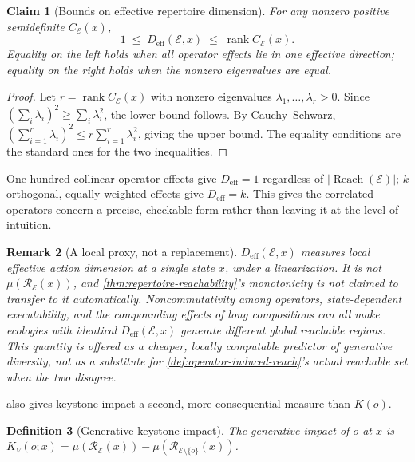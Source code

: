 \documentclass[12pt]{report}
\newtheorem{definition}{Definition}[section]
\newtheorem{claim}[definition]{Claim}
\newtheorem{remark}[definition]{Remark}
\newcommand{\Reach}{\ensuremath{\operatorname{Reach}}}
\begin{document}
\begin{claim}[Bounds on effective repertoire dimension]
\label{thm:effective-repertoire-bounds}
For any nonzero positive semidefinite $C_\mathcal{E}(x)$,
\[
1 \;\leq\; D_{\mathrm{eff}}(\mathcal{E},x) \;\leq\; \operatorname{rank} C_\mathcal{E}(x).
\]
Equality on the left holds when all operator effects lie in one
effective direction; equality on the right holds when the nonzero
eigenvalues are equal.
\end{claim}

\begin{proof}
Let $r = \operatorname{rank} C_\mathcal{E}(x)$ with nonzero eigenvalues
$\lambda_1,\ldots,\lambda_r > 0$. Since $\left(\sum_i \lambda_i\right)^2
\geq \sum_i \lambda_i^2$, the lower bound follows. By Cauchy--Schwarz,
$\left(\sum_{i=1}^r \lambda_i\right)^2 \leq r \sum_{i=1}^r \lambda_i^2$,
giving the upper bound. The equality conditions are the standard ones
for the two inequalities.
\end{proof}

One hundred collinear operator effects give $D_{\mathrm{eff}} = 1$
regardless of $|\Reach(\mathcal{E})|$; $k$ orthogonal, equally weighted
effects give $D_{\mathrm{eff}} = k$. This gives the correlated-operators
concern a precise, checkable form rather than leaving it at the level of
intuition.

\begin{remark}[A local proxy, not a replacement]
\label{rem:effective-repertoire-caveat}
$D_{\mathrm{eff}}(\mathcal{E},x)$ measures local effective action
dimension at a single state $x$, under a linearization. It is not
$\mu(\mathcal{R}_\mathcal{E}(x))$, and \cref{thm:repertoire-reachability}'s
monotonicity is not claimed to transfer to it automatically.
Noncommutativity among operators, state-dependent executability, and the
compounding effects of long compositions can all make ecologies with
identical $D_{\mathrm{eff}}(\mathcal{E},x)$ generate different global
reachable regions. This quantity is offered as a cheaper, locally
computable predictor of generative diversity, not as a substitute for
\cref{def:operator-induced-reach}'s actual reachable set when the two
disagree.
\end{remark}

 also gives keystone impact a second,
more consequential measure than $K(o)$.

\begin{definition}[Generative keystone impact]
\label{def:generative-keystone}
The generative impact of $o$ at $x$ is $K_V(o;x) = \mu(\mathcal{R}_\mathcal{E}(x))
- \mu(\mathcal{R}_{\mathcal{E}\setminus\{o\}}(x))$.
\end{definition}
\end{document}
